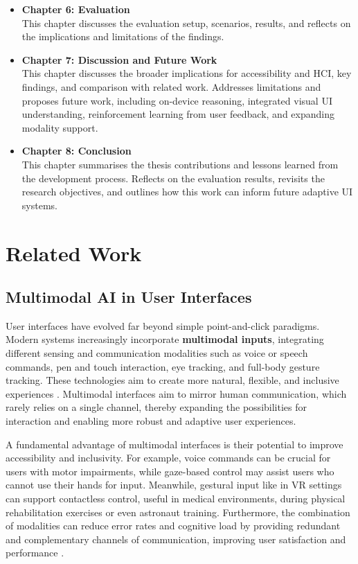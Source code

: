 \documentclass[openany]{book}
\begin{document}
\begin{itemize}
    \item \textbf{Chapter 6: Evaluation} \\
    This chapter discusses the evaluation setup, scenarios, results, and reflects on the implications and limitations of the findings.
    \item \textbf{Chapter 7: Discussion and Future Work} \\
    This chapter discusses the broader implications for accessibility and HCI, key findings, and comparison with related work. Addresses limitations and proposes future work, including on-device reasoning, integrated visual UI understanding, reinforcement learning from user feedback, and expanding modality support.
    \item \textbf{Chapter 8: Conclusion} \\
    This chapter summarises the thesis contributions and lessons learned from the development process. Reflects on the evaluation results, revisits the research objectives, and outlines how this work can inform future adaptive UI systems.
\end{itemize}

\chapter{Related Work}
\section{Multimodal AI in User Interfaces}

User interfaces have evolved far beyond simple point-and-click paradigms. Modern systems increasingly incorporate \textbf{multimodal inputs}, integrating different sensing and communication modalities such as voice or speech commands, pen and touch interaction, eye tracking, and full-body gesture tracking. These technologies aim to create more natural, flexible, and inclusive experiences \cite{10.1145/319382.319398}. Multimodal interfaces aim to mirror human communication, which rarely relies on a single channel, thereby expanding the possibilities for interaction and enabling more robust and adaptive user experiences. 

A fundamental advantage of multimodal interfaces is their potential to improve accessibility and inclusivity. For example, voice commands can be crucial for users with motor impairments, while gaze-based control may assist users who cannot use their hands for input. Meanwhile, gestural input like in VR settings can support contactless control, useful in medical environments, during physical rehabilitation exercises or even astronaut training. Furthermore, the combination of modalities can reduce error rates and cognitive load by providing redundant and complementary channels of communication, improving user satisfaction and performance \cite{10.1145/319382.319398}.
\end{document}
